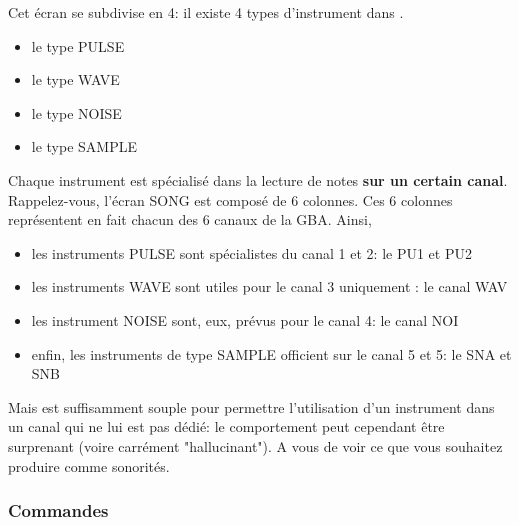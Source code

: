 \documentclass[12pt,a4paper]{article}
\begin{document}
    Cet écran se subdivise en 4: il existe 4 types d'instrument dans \FAT.\medskip
    
    \begin{itemize}
        \item{le type PULSE}
        \item{le type WAVE}
        \item{le type NOISE}
        \item{le type SAMPLE}
    \end{itemize}\medskip
    
     
     Chaque instrument est spécialisé dans la lecture de notes {\bf sur un certain canal}. Rappelez-vous, l'écran SONG est composé de 6 colonnes. Ces 6 colonnes représentent en fait chacun des 6 canaux de la GBA. Ainsi, 
     
     \begin{itemize}
        \item{les instruments PULSE sont spécialistes du canal 1 et 2: le PU1 et PU2}
        \item{les instruments WAVE sont utiles pour le canal 3 uniquement : le canal WAV}
        \item{les instrument NOISE sont, eux, prévus pour le canal 4: le canal NOI}
        \item{enfin, les instruments de type SAMPLE officient sur le canal 5 et 5: le SNA et SNB}
     \end{itemize}\medskip
     
     Mais \FAT est suffisamment souple pour permettre l'utilisation d'un instrument dans un canal qui ne lui est pas dédié: le comportement peut cependant être surprenant (voire carrément "hallucinant"). A vous de voir ce que vous souhaitez produire comme sonorités.

        \subsubsection{Commandes}
        
\end{document}
